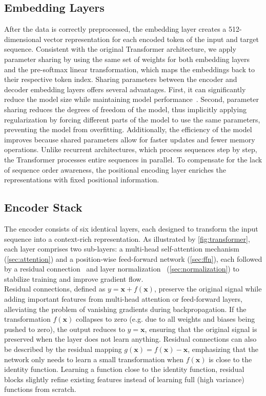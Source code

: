 \subsection{Embedding Layers} 
After the data is correctly preprocessed, the embedding layer creates a 512-dimensional vector representation for each encoded token of the input and target sequence. 
Consistent with the original Transformer architecture, we apply parameter sharing by using the same set of weights for both embedding layers and the pre-softmax linear transformation, which maps the embeddings back to their respective token index.
Sharing parameters between the encoder and decoder embedding layers offers several advantages.
First, it can significantly reduce the model size while maintaining model performance~\cite{press2017usingoutputembeddingimprove}.
Second, parameter sharing reduces the degrees of freedom of the model, thus implicitly applying regularization by forcing different parts of the model to use the same parameters, preventing the model from overfitting.
Additionally, the efficiency of the model improves because shared parameters allow for faster updates and fewer memory operations.
Unlike recurrent architectures, which process sequences step by step, the Transformer processes entire sequences in parallel. 
To compensate for the lack of sequence order awareness, the positional encoding layer enriches the representations with fixed positional information.

\subsection{Encoder Stack} 
The encoder consists of six identical layers, each designed to transform the input sequence into a context-rich representation.
As illustrated by \cref{fig:transformer}, each layer comprises two sub-layers: a multi-head self-attention mechanism (\cref{sec:attention}) and a position-wise feed-forward network (\cref{sec:ffn}), each followed by a residual connection~\cite{he2015deepresiduallearningimage} and layer normalization~\cite{ba2016layernormalization} (\cref{sec:normalization}) to stabilize training and improve gradient flow.\\
Residual connections, defined as  \(y = \mathbf{x} + f(\mathbf{x})\), preserve the original signal while adding important features from multi-head attention or feed-forward layers, alleviating the problem of vanishing gradients during backpropagation.
If the transformation \(f(\mathbf{x})\) collapses to zero (e.g. due to all weights and biases being pushed to zero), the output reduces to \(y = \mathbf{x}\), ensuring that the original signal is preserved when the layer does not learn anything.
Residual connections can also be described by the residual mapping \(g(\mathbf{x}) = f(\mathbf{x}) - \mathbf{x}\), emphasizing that the network only needs to learn a small transformation when \(f(\mathbf{x})\) is close to the identity function.
Learning a function close to the identity function, residual blocks slightly refine existing features instead of learning full (high variance) functions from scratch. \\

